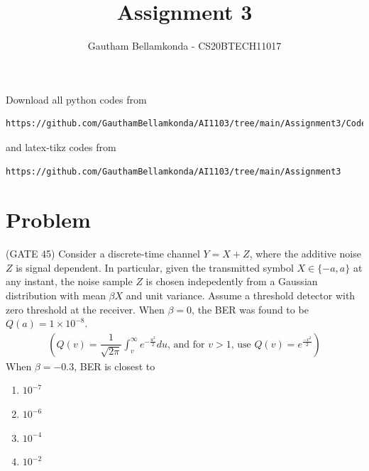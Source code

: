 \documentclass[journal,10pt,twocolumn]{IEEEtran}
\begin{document}
     \def\topbox#1{\raisebox{-\baselineskip}[0in][0in]{#1}}
     \def\midbox#1{\raisebox{-0.5\baselineskip}[0in][0in]{#1}}
\vspace{3cm}
\title{Assignment 3}
\author{Gautham Bellamkonda - CS20BTECH11017}
\maketitle
\newpage
\bigskip
\renewcommand{\thetable}{\theenumi}
Download all python codes from 
\begin{lstlisting}
https://github.com/GauthamBellamkonda/AI1103/tree/main/Assignment3/Codes
\end{lstlisting}
and latex-tikz codes from 
\begin{lstlisting}
https://github.com/GauthamBellamkonda/AI1103/tree/main/Assignment3
\end{lstlisting}
\section{Problem}
(GATE 45) Consider a discrete-time channel $Y = X + Z$, where the additive noise $Z$ is signal dependent. In particular, given the transmitted symbol $X \in \{-a, a \}$ at any instant, the noise sample $Z$ is chosen indepedently from a Gaussian distribution with mean $\beta X$ and unit variance. Assume a threshold detector with zero threshold at the receiver. When $\beta = 0$, the BER was found to be $Q(a) = 1 \times 10^{-8}.$
\begin{align}
\left( Q(v) = \dfrac{1}{\sqrt{2 \pi}} \int_v ^{\infty} e^{-\frac{u^2}{2}} du \text{, and for } v > 1 \text{, use } Q(v) = e^{\frac{-v^2}{2}} \right)
\end{align}
When $\beta = -0.3$, BER is closest to
\begin{enumerate}[label = (\Alph*)]
\item $10^{-7}$
\item $10^{-6}$
\item $10^{-4}$ \label{option C}
\item $10^{-2}$
\end{enumerate}
\end{document}
